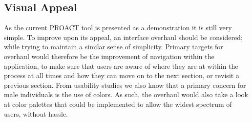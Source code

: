 \documentclass[journal]{vgtc}                %
\begin{document}
        \subsection{Visual Appeal}
                As the current PROACT tool is presented as a demonstration it is still very simple.
                To improve upon its appeal, an interface overhaul should be considered; while trying to maintain a similar sense of simplicity.
                Primary targets for overhaul would therefore be the improvement of navigation within the application, to make sure that users are aware of where they are at within the process at all times and how they can move on to the next section, or revisit a previous section.
                From usability studies we also know that a primary concern for male individuals is the use of colors.
                As such, the overhaul would also take a look at color palettes that could be implemented to allow the widest spectrum of users, without hassle.



%

%
%
%


\end{document}
